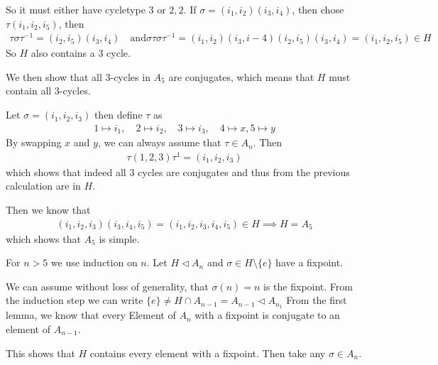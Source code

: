So it must either have cycletype $3$ or $2,2$. 
If $\sigma = (i_1,i_2)(i_3,i_4)$, then chose $\tau(i_1,i_2,i_5)$, then
\begin{align*}
	\tau \sigma \tau^{-1} = (i_2,i_5)(i_3,i_4) \quad \text{and} \sigma \tau \sigma \tau^{-1} = (i_1,i_2)(i_3,i-4)(i_2,i_5)(i_3,i_4) = (i_1,i_2,i_5) \in H
\end{align*}
So $H$ also contains a $3$ cycle.

We then show that all $3$-cycles in $A_5$ are conjugates, which means that $H$ must contain all $3$-cycles.

Let $\sigma = (i_1,i_2,i_3)$ then define $\tau$ as
\begin{align*}
	1 \mapsto i_1, \quad 2 \mapsto i_2, \quad 3 \mapsto i_3, \quad 4 \mapsto x, 5 \mapsto y
\end{align*}
By swapping $x$ and $y$, we can always assume that $\tau \in A_n$. Then
\begin{align*}
	\tau(1,2,3)\tau^{1} = (i_1,i_2,i_3)	 
\end{align*}
which shows that indeed all $3$ cycles are conjugates and thus from the previous calculation are in $H$.

Then we know that
\begin{align*}
	(i_1,i_2,i_3)(i_3,i_4,i_5) = (i_1,i_2,i_3,i_4,i_5) \in H \implies H = A_5
\end{align*}
which shows that $A_5$ is simple.

For $n > 5$ we use induction on $n$. Let $H \lhd  A_n$ and $\sigma \in H \setminus \{e\}$ have a fixpoint.

We can assume without loss of generality, that $\sigma(n) = n$ is the fixpoint. From the induction step we can write $\{e\} \neq H \cap A_{n-1} = A_{n-1} \lhd A_{n_1}$ From the first lemma, we know that every Element of $A_n$ with a fixpoint is conjugate to an element of $A_{n-1}$.

This shows that $H$ contains every element with a fixpoint. Then take any $\sigma \in A_n$.

